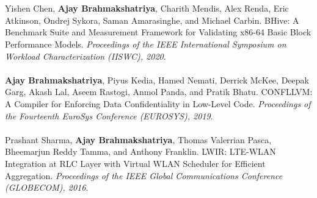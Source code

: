\documentclass[10pt]{article}
\newcommand{\textbfx}[1]{{\bf #1}}
\newcommand{\textitx}[1]{{\it #1}}
\begin{document}
\\ \\
Yishen Chen, \textbfx{Ajay Brahmakshatriya}, Charith Mendis, Alex Renda, Eric Atkinson, Ondrej Sykora, Saman Amarasinghe, and Michael Carbin. BHive: A Benchmark Suite and Measurement Framework for Validating x86-64 Basic Block Performance Models. 
\textitx{Proceedings of the IEEE International Symposium on Workload Characterization (IISWC), 2020}.
\\ \\
\textbfx{Ajay Brahmakshatriya}, Piyus Kedia, Hamed Nemati, Derrick McKee, Deepak Garg, Akash Lal, Aseem Rastogi, Anmol Panda, and Pratik Bhatu. CONFLLVM: A Compiler for Enforcing Data Confidentiality in Low-Level Code. 
\textitx{Proceedings of the Fourteenth EuroSys Conference (EUROSYS), 2019}.
\\ \\
Prashant Sharma, \textbfx{Ajay Brahmakshatriya}, Thomas Valerrian Pasca, Bheemarjun Reddy Tamma, and Anthony Franklin. LWIR: LTE-WLAN Integration at RLC Layer with Virtual WLAN Scheduler for Efficient Aggregation. 
\textitx{Proceedings of the IEEE Global Communications Conference (GLOBECOM), 2016}.
\\ \\ 
\end{document}
